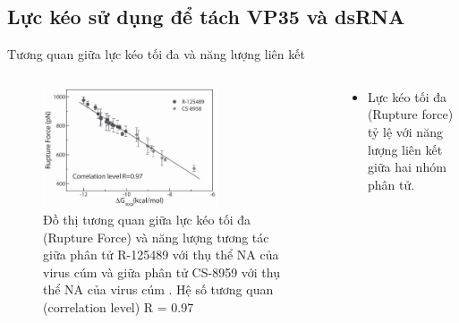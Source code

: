 \documentclass[10pt]{beamer}
\begin{document}
\subsection{Lực kéo sử dụng để tách VP35 và dsRNA}
	\begin{frame}{Tương quan giữa lực kéo tối đa và năng lượng liên kết}
	\begin{columns}
	\begin{column}{0.5\textwidth}
		\begin{figure}[t]
		\centering
		\includegraphics[width=0.7\textwidth,natwidth=610,natheight=642]{../rupture_force-delta_G}
		\caption{Đồ thị tương quan giữa lực kéo tối đa (Rupture Force) và năng lượng tương tác giữa phân tử R-125489 với thụ thể NA của virus cúm và giữa phân tử CS-8959 với thụ thể NA của virus cúm \cite{SuanLi2012}. Hệ số tương quan (correlation level) R = 0.97}
		\label{fig:rupture-force-delta-g}
		\end{figure}
	\end{column}
	
	\begin{column}{0.5\textwidth}
	\begin{itemize}
	\item Lực kéo tối đa (Rupture force) tỷ lệ với năng lượng liên kết giữa hai nhóm phân tử.
	\end{itemize}
	\end{column}
	\end{columns}
	\end{frame}
	
\end{document}
